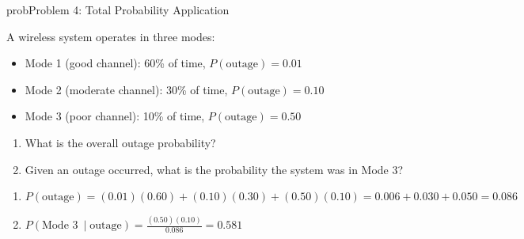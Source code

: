 \begin{PSbox}[unbreakable]{prob}{Problem 4: Total Probability Application}

A wireless system operates in three modes:

\begin{itemize}
\tightlist
\item
  Mode 1 (good channel): 60\% of time, $P(\text{outage}) = 0.01$
\item
  Mode 2 (moderate channel): 30\% of time, $P(\text{outage}) = 0.10$
\item
  Mode 3 (poor channel): 10\% of time, $P(\text{outage}) = 0.50$
\end{itemize}

\begin{enumerate}
\def\labelenumi{(\alph{enumi})}
\tightlist
\item
  What is the overall outage probability?
\item
  Given an outage occurred, what is the probability the system was in Mode 3?
\end{enumerate}

\PSsolution{} 

\begin{enumerate}
\def\labelenumi{(\alph{enumi})}
\item
  $P(\text{outage}) = (0.01)(0.60) + (0.10)(0.30) + (0.50)(0.10) = 0.006 + 0.030 + 0.050 = 0.086$
\item
  $\displaystyle P(\text{Mode 3}\ \mid \text{outage}) = \frac{(0.50)(0.10)}{0.086} = 0.581$
\end{enumerate}

\end{PSbox}

